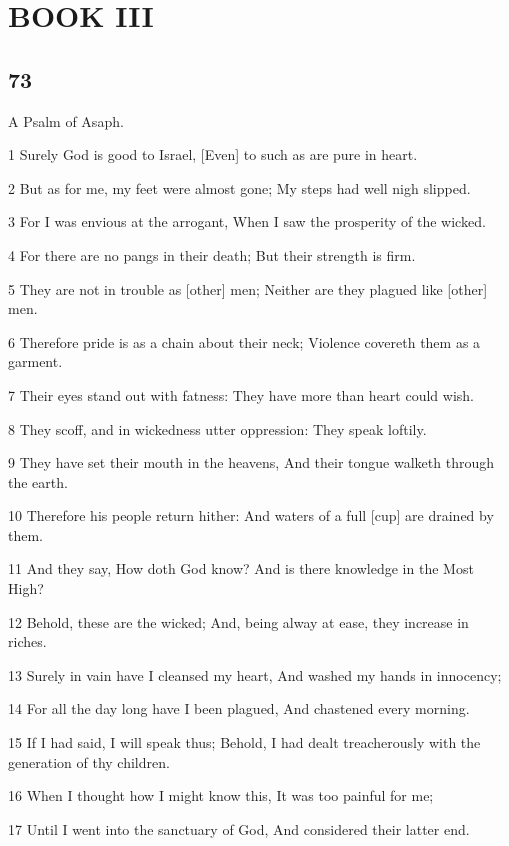 \part{BOOK III}

\chapter{73}

\par A Psalm of Asaph.

\par 1 Surely God is good to Israel, [Even] to such as are pure in heart.
\par 2 But as for me, my feet were almost gone; My steps had well nigh slipped.
\par 3 For I was envious at the arrogant, When I saw the prosperity of the wicked.
\par 4 For there are no pangs in their death; But their strength is firm.
\par 5 They are not in trouble as [other] men; Neither are they plagued like [other] men.
\par 6 Therefore pride is as a chain about their neck; Violence covereth them as a garment.
\par 7 Their eyes stand out with fatness: They have more than heart could wish.
\par 8 They scoff, and in wickedness utter oppression: They speak loftily.
\par 9 They have set their mouth in the heavens, And their tongue walketh through the earth.
\par 10 Therefore his people return hither: And waters of a full [cup] are drained by them.
\par 11 And they say, How doth God know? And is there knowledge in the Most High?
\par 12 Behold, these are the wicked; And, being alway at ease, they increase in riches.
\par 13 Surely in vain have I cleansed my heart, And washed my hands in innocency;
\par 14 For all the day long have I been plagued, And chastened every morning.
\par 15 If I had said, I will speak thus; Behold, I had dealt treacherously with the generation of thy children.
\par 16 When I thought how I might know this, It was too painful for me;
\par 17 Until I went into the sanctuary of God, And considered their latter end.
